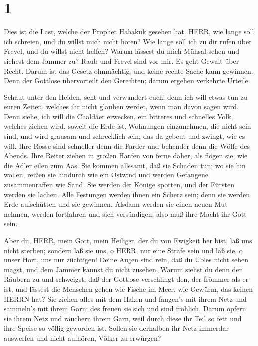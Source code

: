 \hypertarget{section}{%
\section{1}\label{section}}

 Dies ist die Last, welche der Prophet Habakuk gesehen hat.
 HERR, wie lange soll ich schreien, und du willst mich nicht
hören? Wie lange soll ich zu dir rufen über Frevel, und du willst nicht
helfen?  Warum lässest du mich Mühsal sehen und siehest dem
Jammer zu? Raub und Frevel sind vor mir. Es geht Gewalt über Recht.
 Darum ist das Gesetz ohnmächtig, und keine rechte Sache
kann gewinnen. Denn der Gottlose übervorteilt den Gerechten; darum
ergehen verkehrte Urteile.

 Schaut unter den Heiden, seht und verwundert euch! denn ich
will etwas tun zu euren Zeiten, welches ihr nicht glauben werdet, wenn
man davon sagen wird.  Denn siehe, ich will die Chaldäer
erwecken, ein bitteres und schnelles Volk, welches ziehen wird, soweit
die Erde ist, Wohnungen einzunehmen, die nicht sein sind, 
und wird grausam und schrecklich sein; das da gebeut und zwingt, wie es
will.  Ihre Rosse sind schneller denn die Parder und
behender denn die Wölfe des Abends. Ihre Reiter ziehen in großen Haufen
von ferne daher, als flögen sie, wie die Adler eilen zum Aas.
 Sie kommen allesamt, daß sie Schaden tun; wo sie hin
wollen, reißen sie hindurch wie ein Ostwind und werden Gefangene
zusammenraffen wie Sand.  Sie werden der Könige spotten,
und der Fürsten werden sie lachen. Alle Festungen werden ihnen ein
Scherz sein; denn sie werden Erde aufschütten und sie gewinnen.
 Alsdann werden sie einen neuen Mut nehmen, werden
fortfahren und sich versündigen; also muß ihre Macht ihr Gott sein.

 Aber du, HERR, mein Gott, mein Heiliger, der du von
Ewigkeit her bist, laß uns nicht sterben; sondern laß sie uns, o HERR,
nur eine Strafe sein und laß sie, o unser Hort, uns nur züchtigen!
 Deine Augen sind rein, daß du Übles nicht sehen magst, und
dem Jammer kannst du nicht zusehen. Warum siehst du denn den Räubern zu
und schweigst, daß der Gottlose verschlingt den, der frömmer als er ist,
 und lässest die Menschen gehen wie Fische im Meer, wie
Gewürm, das keinen HERRN hat?  Sie ziehen alles mit dem
Haken und fangen's mit ihrem Netz und sammeln's mit ihrem Garn; des
freuen sie sich und sind fröhlich.  Darum opfern sie ihrem
Netz und räuchern ihrem Garn, weil durch diese ihr Teil so fett und ihre
Speise so völlig geworden ist.  Sollen sie derhalben ihr
Netz immerdar auswerfen und nicht aufhören, Völker zu erwürgen?

